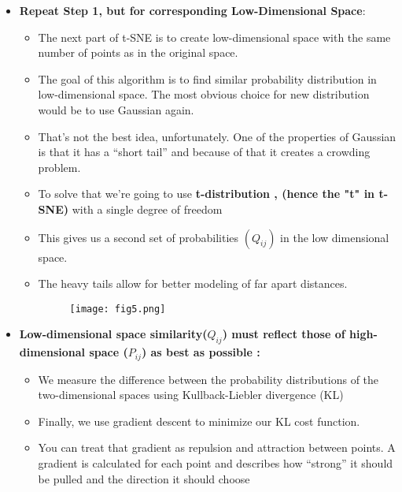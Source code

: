 \documentclass[a4paper, 11pt]{article}
\begin{document}
\begin{itemize}
    \item \textbf{Repeat Step 1, but for corresponding Low-Dimensional Space}:
    \begin{itemize}
        \item The next part of t-SNE is to create low-dimensional space with the same number of points as in the original space.
        \item The goal of this algorithm is to find similar probability distribution in low-dimensional space. The most obvious choice for new distribution would be to use Gaussian again.
        \item That’s not the best idea, unfortunately. One of the properties of Gaussian is that it has a “short tail” and because of that it creates a crowding problem. 
        \item To solve that we’re going to use \textbf{t-distribution , (hence the "t" in t-SNE)} with a single degree of freedom
        \item This gives us a second set of probabilities $(Q_{ij})$ in the low dimensional space.
        \item The heavy tails allow for better modeling of far apart distances.     
        \begin{figure}[ht!]
          \centering
          \texttt{[image: fig5.png]}
          \label{fig:t-distribution}
        \end{figure}    
    \end{itemize}
    \item  \textbf{Low-dimensional space similarity($Q_{ij}$) must reflect those of high-dimensional space ($P_{ij}$) as best as possible :}
    \begin{itemize}
        \item We measure the difference between the probability distributions of the two-dimensional spaces using Kullback-Liebler divergence (KL)
        \item Finally, we use gradient descent to minimize our KL cost function.
        \item You can treat that gradient as repulsion and attraction between points. A gradient is calculated for each point and describes how “strong” it should be pulled and the direction it should choose
    \end{itemize}  
\end{itemize}

\end{document}
